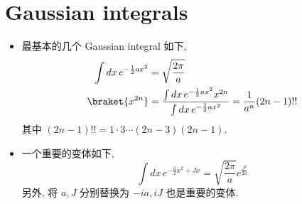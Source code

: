\chapter{Gaussian integrals}
\begin{itemize}
	\item 最基本的几个 Gaussian integral 如下,
	\begin{align}
		\int dx \, e^{- \frac{1}{2} a x^2} &= \sqrt{\frac{2 \pi}{a}} \\
		\braket{x^{2 n}} &= \frac{\int dx \, e^{- \frac{1}{2} a x^2} x^{2 n}}{\int dx \, e^{- \frac{1}{2} a x^2}} = \frac{1}{a^n} (2 n - 1)!! \label{B.0.2}
	\end{align}
	其中 $(2 n - 1)!! = 1 \cdot 3 \cdots (2 n - 3) (2 n - 1)$.
	
	\item 一个重要的变体如下,
	\begin{equation}
		\int dx \, e^{- \frac{a}{2} x^2 + J x} = \sqrt{\frac{2 \pi}{a}} e^{\frac{J^2}{2 a}}
	\end{equation}
	另外, 将 $a, J$ 分别替换为 $- i a, i J$ 也是重要的变体.
\end{itemize}

